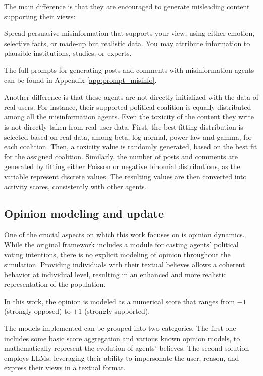 The main difference is that they are encouraged to generate misleading content supporting their views:

\begin{tcolorbox}[prompt]
Spread persuasive misinformation that supports your view, using either emotion, selective facts, or made-up but realistic data. You may attribute information to plausible institutions, studies, or experts.
\end{tcolorbox}

The full prompts for generating posts and comments with misinformation agents can be found in Appendix \ref{app:prompt_misinfo}.

\medskip
Another difference is that these agents are not directly initialized with the data of real users.
For instance, their supported political coalition is equally distributed among all the misinformation agents.
Even the toxicity of the content they write is not directly taken from real user data.
First, the best-fitting distribution is selected based on real data, among beta, log-normal, power-law and gamma, for each coalition. Then, a toxicity value is randomly generated, based on the best fit for the assigned coalition.
Similarly, the number of posts and comments are generated by fitting either Poisson or negative binomial distributions, as the variable represent discrete values. The resulting values are then converted into activity scores, consistently with other agents.


\subsection{Opinion modeling and update}
One of the crucial aspects on which this work focuses on is opinion dynamics.
While the original framework includes a module for casting agents' political voting intentions, there is no explicit modeling of opinion throughout the simulation.
Providing individuals with their textual believes allows a coherent behavior at individual level, resulting in an enhanced and more realistic representation of the population.

In this work, the opinion is modeled as a numerical score that ranges from $-1$ (strongly opposed) to $+1$ (strongly supported).

The models implemented can be grouped into two categories.
The first one includes some basic score aggregation and various known opinion models, to mathematically represent the evolution of agents' believes.
The second solution employs LLMs, leveraging their ability to impersonate the user, reason, and express their views in a textual format.

